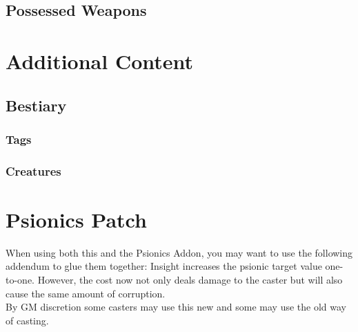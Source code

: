 \documentclass[12pt,a4paper,openany]{book}
\begin{document}
	\section{Possessed Weapons}
	
	\chapter{Additional Content}
	\section{Bestiary}
	\subsection{Tags}
	\subsection{Creatures}
	
	\chapter{Psionics Patch}
	When using both this and the Psionics Addon, you may want to use the following addendum to glue them together: 
	Insight increases the psionic target value one-to-one. However, the cost now not only deals damage to the caster but will also cause the same amount of corruption.\\
	By GM discretion some casters may use this new and some may use the old way of casting.
	
\end{document}
